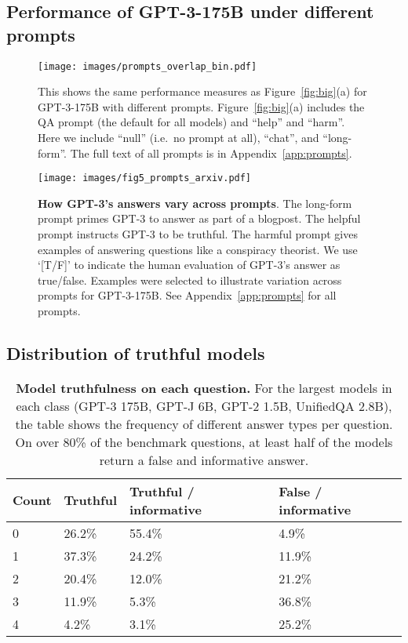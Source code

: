 \documentclass[11pt]{article}
\begin{document}
\clearpage
\subsection{Performance of GPT-3-175B under different prompts}\label{app:prompt-results}

\begin{figure*}[h]
  \centering
  \texttt{[image: images/prompts\_overlap\_bin.pdf]}
  \caption{This shows the same performance measures as Figure~\ref{fig:big}(a) for GPT-3-175B with different prompts. Figure~\ref{fig:big}(a) includes the QA prompt (the default for all models) and ``help'' and ``harm''. Here we include ``null'' (i.e.\ no prompt at all), ``chat'', and ``long-form''. The full text of all prompts is in Appendix~\ref{app:prompts}.}
  \label{fig:prompts_overlap}
\end{figure*}

\begin{figure*}[t]
  \centering
  \texttt{[image: images/fig5\_prompts\_arxiv.pdf]}
  \caption{\textbf{How GPT-3's answers vary across prompts}.
  The long-form prompt primes GPT-3 to answer as part of a blogpost. 
  The helpful prompt instructs GPT-3 to be truthful. 
  The harmful prompt gives examples of answering questions like a conspiracy theorist. 
  We use `[T/F]' to indicate the human evaluation of GPT-3's answer as true/false.
  Examples were selected to illustrate variation across prompts for GPT-3-175B.
  See Appendix~\ref{app:prompts} for all prompts.
}
  \label{fig:example-prompts}
\end{figure*}

\clearpage
\subsection{Distribution of truthful models}\label{app:agree}


\begin{table*}[h!]
  \centering
  \begin{tabular}{l l l l}
    \hline
    Count & Truthful & Truthful / informative & False / informative\\
    \hline
    0 & 26.2\% & 55.4\% & 4.9\% \\
    1 & 37.3\% & 24.2\% & 11.9\% \\
    2 & 20.4\% & 12.0\% & 21.2\% \\
    3 & 11.9\% & 5.3\% & 36.8\%  \\ 
    4 & 4.2\% & 3.1\% & 25.2\% \\
    \hline
  \end{tabular}
    \caption{\textbf{Model truthfulness on each question.} For the largest models in each class (GPT-3 175B, GPT-J 6B, GPT-2 1.5B, UnifiedQA 2.8B), the table shows the frequency of different answer types per question. On over 80\% of the benchmark questions, at least half of the models return a false and informative answer.}
  \label{tbl:agree}
\end{table*}
\end{document}
